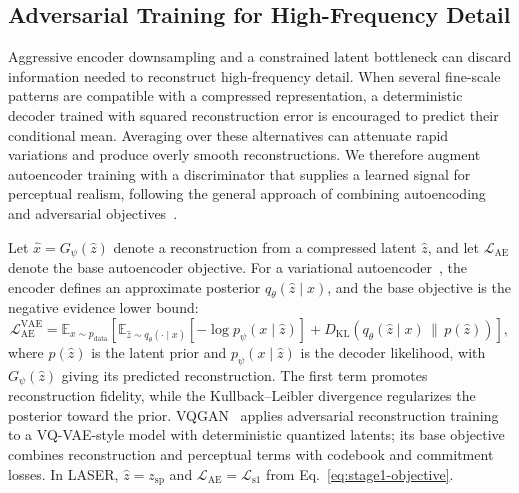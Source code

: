 \documentclass[10pt]{article}
\begin{document}
\subsection{Adversarial Training for High-Frequency Detail}
\label{sec:adversarial-training}

Aggressive encoder downsampling and a constrained latent bottleneck can discard information needed to reconstruct high-frequency detail. When several fine-scale patterns are compatible with a compressed representation, a deterministic decoder trained with squared reconstruction error is encouraged to predict their conditional mean. Averaging over these alternatives can attenuate rapid variations and produce overly smooth reconstructions. We therefore augment autoencoder training with a discriminator that supplies a learned signal for perceptual realism, following the general approach of combining autoencoding and adversarial objectives~\citep{larsen2016vaegan,esser2021vqgan}.

Let $\hat{x}=G_\psi(\hat{z})$ denote a reconstruction from a compressed latent $\hat{z}$, and let $\mathcal{L}_{\mathrm{AE}}$ denote the base autoencoder objective. For a variational autoencoder~\citep{kingma2014vae}, the encoder defines an approximate posterior $q_\theta(\hat{z}\mid x)$, and the base objective is the negative evidence lower bound:
\begin{equation}
    \mathcal{L}_{\mathrm{AE}}^{\mathrm{VAE}}
    = \mathbb{E}_{x\sim p_{\mathrm{data}}}
    \left[
        \mathbb{E}_{\hat{z}\sim q_\theta(\cdot\mid x)}
        [-\log p_\psi(x\mid\hat{z})]
        + D_{\mathrm{KL}}\!\left(q_\theta(\hat{z}\mid x)\,\|\,p(\hat{z})\right)
    \right],
    \label{eq:vae-base-objective}
\end{equation}
where $p(\hat{z})$ is the latent prior and $p_\psi(x\mid\hat{z})$ is the decoder likelihood, with $G_\psi(\hat{z})$ giving its predicted reconstruction. The first term promotes reconstruction fidelity, while the Kullback--Leibler divergence regularizes the posterior toward the prior. VQGAN~\citep{esser2021vqgan} applies adversarial reconstruction training to a VQ-VAE-style model with deterministic quantized latents; its base objective combines reconstruction and perceptual terms with codebook and commitment losses. In LASER, $\hat{z}=z_{\mathrm{sp}}$ and $\mathcal{L}_{\mathrm{AE}}=\mathcal{L}_{\mathrm{s1}}$ from Eq.~\ref{eq:stage1-objective}.
\end{document}

